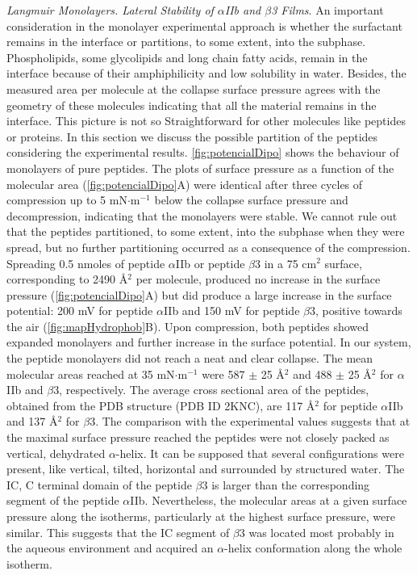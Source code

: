 \documentclass[journal=jacsat,manuscript=article]{achemso}
\begin{document}
\noindent \textit{Langmuir Monolayers. 
Lateral Stability of $\alpha$IIb and $\beta$3 Films}. An important consideration in the monolayer experimental approach is whether the surfactant remains in the interface or partitions, to some extent, into the subphase. Phospholipids, some glycolipids and long chain fatty acids, remain in the interface because of their amphiphilicity and low solubility in water. Besides, the measured area per molecule at the collapse surface pressure agrees with the geometry of these molecules \cite{1966_Gaines} indicating that all the material remains in the interface. This picture is not so Straightforward for other molecules like peptides or proteins. In this section we discuss the possible partition of the peptides considering the experimental results. \autoref{fig:potencialDipo} shows the behaviour of monolayers of pure peptides. The plots of surface pressure as a function of the molecular area (\autoref{fig:potencialDipo}A) were identical after three cycles of compression up to 5 mN$\cdot$m$^{-1}$ below the collapse surface pressure and decompression, indicating that the monolayers were stable. We cannot rule out that the peptides partitioned, to some extent, into the subphase when they were spread, but no further partitioning occurred as a consequence of the compression. Spreading 0.5 nmoles of peptide $\alpha$IIb or peptide $\beta$3 in a 75 cm$^2$ surface, corresponding to 2490 Å$^2$ per molecule, produced no increase in the surface pressure (\autoref{fig:potencialDipo}A) but did produce a large increase in the surface potential: 200 mV for peptide $\alpha$IIb and 150 mV for peptide $\beta$3, positive towards the air (\autoref{fig:mapHydrophob}B).  Upon compression, both peptides showed expanded monolayers and further increase in the surface potential. In our system, the peptide monolayers did not reach a neat and clear collapse. The mean molecular areas reached at 35 mN$\cdot$m$^{-1}$ were 587 $\pm$ 25 Å$^2$ and 488 $\pm$ 25 Å$^2$ for $\alpha$IIb and  $\beta$3, respectively. The average cross sectional area of the peptides, obtained from the PDB structure (PDB ID 2KNC), are 117 Å$^2$ for peptide $\alpha$IIb and 137 Å$^2$ for $\beta$3. 
The comparison with the experimental values suggests that at the maximal surface pressure reached the peptides were not closely packed as vertical, dehydrated $\alpha$-helix. It can be supposed that several configurations were present, like vertical, tilted, horizontal and surrounded by structured water. The IC, C terminal domain of the peptide $\beta$3 is larger than the corresponding segment of the peptide $\alpha$IIb. 
Nevertheless, the molecular areas at a given surface pressure along the isotherms, particularly at the highest surface pressure, were similar. This suggests that the IC segment of $\beta$3 was located most probably in the aqueous environment and acquired an $\alpha$-helix conformation along the whole isotherm.
\end{document}
